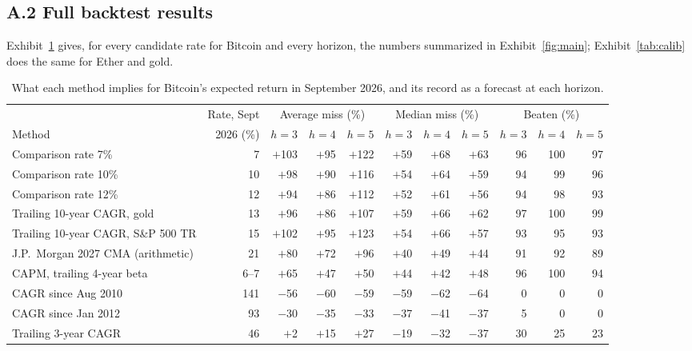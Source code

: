 \documentclass[12pt]{article}
\theoremstyle{plain}
\theoremstyle{remark}
\begin{document}
\subsection*{A.2 Full backtest results}

Exhibit~\ref{tab:today} gives, for every candidate rate for Bitcoin and every horizon, the numbers summarized in Exhibit~\ref{fig:main}; Exhibit~\ref{tab:calib} does the same for Ether and gold.

\begin{table}[H]
\centering
\caption{What each method implies for Bitcoin's expected return in September 2026, and its record as a forecast at each horizon.}
\label{tab:today}
\footnotesize\setlength{\tabcolsep}{2pt}
\begin{tabular}{lr@{\hspace{4pt}}rrr@{\hspace{4pt}}rrr@{\hspace{4pt}}rrr}
\toprule
 & Rate, Sept & \multicolumn{3}{c}{Average miss (\%)} & \multicolumn{3}{c}{Median miss (\%)} & \multicolumn{3}{c}{Beaten (\%)}\\
\cmidrule(lr){3-5}\cmidrule(lr){6-8}\cmidrule(lr){9-11}
Method & 2026 (\%) & $h=3$ & $h=4$ & $h=5$ & $h=3$ & $h=4$ & $h=5$ & $h=3$ & $h=4$ & $h=5$\\
\midrule
Comparison rate 7\% & 7 & $+$103 & $+$95 & $+$122 & $+$59 & $+$68 & $+$63 & 96 & 100 & 97 \\
Comparison rate 10\% & 10 & $+$98 & $+$90 & $+$116 & $+$54 & $+$64 & $+$59 & 94 & 99 & 96 \\
Comparison rate 12\% & 12 & $+$94 & $+$86 & $+$112 & $+$52 & $+$61 & $+$56 & 94 & 98 & 93 \\
Trailing 10-year CAGR, gold & 13 & $+$96 & $+$86 & $+$107 & $+$59 & $+$66 & $+$62 & 97 & 100 & 99 \\
Trailing 10-year CAGR, S\&P 500 TR & 15 & $+$102 & $+$95 & $+$123 & $+$54 & $+$66 & $+$57 & 93 & 95 & 93 \\
J.P.\ Morgan 2027 CMA (arithmetic) & 21 & $+$80 & $+$72 & $+$96 & $+$40 & $+$49 & $+$44 & 91 & 92 & 89 \\
CAPM, trailing 4-year beta & 6--7 & $+$65 & $+$47 & $+$50 & $+$44 & $+$42 & $+$48 & 96 & 100 & 94 \\
CAGR since Aug 2010 & 141 & $-$56 & $-$60 & $-$59 & $-$59 & $-$62 & $-$64 & 0 & 0 & 0 \\
CAGR since Jan 2012 & 93 & $-$30 & $-$35 & $-$33 & $-$37 & $-$41 & $-$37 & 5 & 0 & 0 \\
Trailing 3-year CAGR & 46 & $+$2 & $+$15 & $+$27 & $-$19 & $-$32 & $-$37 & 30 & 25 & 23 \\

\end{tabular}
\end{table}
\end{document}
